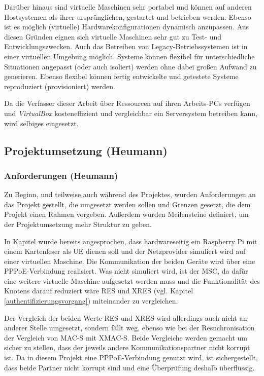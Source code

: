 Darüber hinaus sind virtuelle Maschinen sehr portabel und können auf anderen Hostsystemen als
ihrer ursprünglichen, gestartet und betrieben werden. Ebenso ist es möglich (virtuelle)
Hardwarekonfigurationen dynamisch anzupassen. Aus diesen Gründen eignen sich virtuelle
Maschinen sehr gut zu Test- und Entwicklungszwecken. Auch das Betreiben von Legacy-Betriebssystemen
ist in einer virtuellen Umgebung möglich. Systeme können flexibel für unterschiedliche
Situationen angepasst (oder auch isoliert) werden ohne dabei großen Aufwand zu generieren.
Ebenso flexibel können fertig entwickelte und getestete Systeme reproduziert (provisioniert) werden.

Da die Verfasser dieser Arbeit über Ressourcen auf ihren Arbeits-PCs verfügen und \textit{VirtualBox}
kosteneffizient und vergleichbar ein Serversystem betreiben kann, wird selbiges eingesetzt.

\subsection{Projektumsetzung (Heumann)}
 \subsubsection{Anforderungen (Heumann)}
 Zu Beginn, und teilweise auch während des Projektes, wurden Anforderungen
 an das Projekt gestellt, die umgesetzt werden sollen und Grenzen gesetzt, die
 dem Projekt einen Rahmen vorgeben. Außerdem wurden Meilensteine definiert,
 um der Projektumsetzung mehr Struktur zu geben.
 
 In Kapitel  wurde bereits angesprochen, dass hardwareseitig
 ein Raspberry Pi mit einem Kartenleser als \ac{UE} dienen soll und der Netzprovider
 simuliert wird auf einer virtuellen Maschine. Die Kommunikation der beiden Geräte
 wird über eine \ac{PPPoE}-Verbindung realisiert. Was nicht simuliert wird, ist der
 \ac{MSC}, da dafür eine weitere virtuelle Maschine aufgesetzt werden muss und die
 Funktionalität des Knotens darauf reduziert wäre RES und XRES (vgl. Kapitel \ref{authentifizierungsvorgang})
 miteinander zu vergleichen.
 
 Der Vergleich der beiden Werte RES und XRES wird allerdings auch nicht an anderer
 Stelle umgesetzt, sondern fällt weg, ebenso wie bei der Resnchronisation der Vergleich
 von MAC-S mit XMAC-S. Beide Vergleiche werden gemacht um sicher zu stellen, dass
 der jeweils andere Kommunikationspartner nicht korrupt ist. Da in diesem Projekt eine
 PPPoE-Verbindung genutzt wird, ist sichergestellt, dass beide Partner nicht korrupt sind
 und eine Überprüfung deshalb überflüssig.
 
